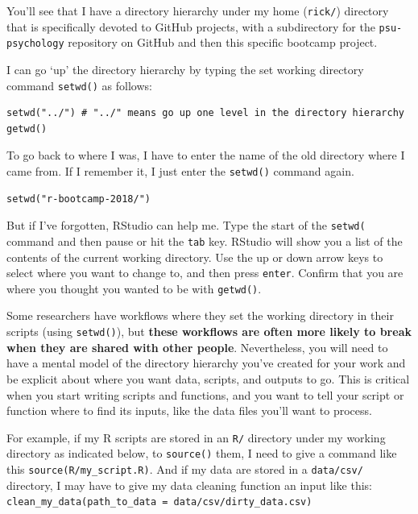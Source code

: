 \documentclass[]{article}
\begin{document}
You'll see that I have a directory hierarchy under my home
(\texttt{rick/}) directory that is specifically devoted to GitHub
projects, with a subdirectory for the \texttt{psu-psychology} repository
on GitHub and then this specific bootcamp project.

I can go `up' the directory hierarchy by typing the set working
directory command \texttt{setwd()} as follows:

\begin{verbatim}
setwd("../") # "../" means go up one level in the directory hierarchy
getwd()
\end{verbatim}

To go back to where I was, I have to enter the name of the old directory
where I came from. If I remember it, I just enter the \texttt{setwd()}
command again.

\begin{verbatim}
setwd("r-bootcamp-2018/")
\end{verbatim}

But if I've forgotten, RStudio can help me. Type the start of the
\texttt{setwd(\textquotesingle{}} command and then pause or hit the
\texttt{tab} key. RStudio will show you a list of the contents of the
current working directory. Use the up or down arrow keys to select where
you want to change to, and then press \texttt{enter}. Confirm that you
are where you thought you wanted to be with \texttt{getwd()}.

Some researchers have workflows where they set the working directory in
their scripts (using \texttt{setwd()}), but \textbf{these workflows are
often more likely to break when they are shared with other people}.
Nevertheless, you will need to have a mental model of the directory
hierarchy you've created for your work and be explicit about where you
want data, scripts, and outputs to go. This is critical when you start
writing scripts and functions, and you want to tell your script or
function where to find its inputs, like the data files you'll want to
process.

For example, if my R scripts are stored in an \texttt{R/} directory
under my working directory as indicated below, to \texttt{source()}
them, I need to give a command like this
\texttt{source(\textquotesingle{}R/my\_script.R)}. And if my data are
stored in a \texttt{data/csv/} directory, I may have to give my data
cleaning function an input like this:
\texttt{clean\_my\_data(path\_to\_data\ =\ \textquotesingle{}data/csv/dirty\_data.csv\textquotesingle{})}
\end{document}
